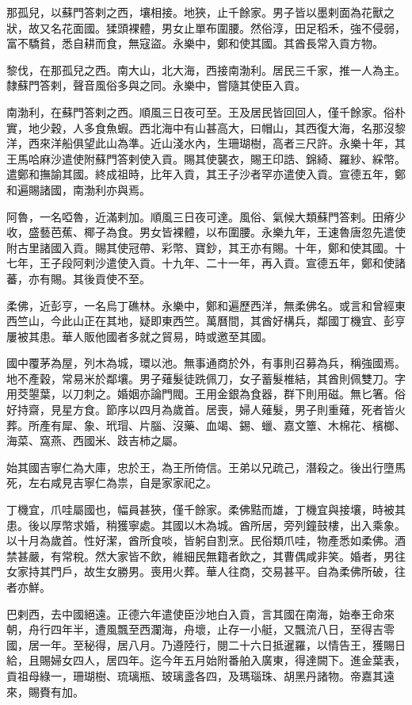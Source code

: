 \begin{pinyinscope}
那孤兒，以蘇門答剌之西，壤相接。地狹，止千餘家。男子皆以墨剌面為花獸之狀，故又名花面國。猱頭裸體，男女止單布圍腰。然俗淳，田足稻禾，強不侵弱，富不驕貧，悉自耕而食，無寇盜。永樂中，鄭和使其國。其酋長常入貢方物。

黎伐，在那孤兒之西。南大山，北大海，西接南渤利。居民三千家，推一人為主。隸蘇門答剌，聲音風俗多與之同。永樂中，嘗隨其使臣入貢。

南渤利，在蘇門答剌之西。順風三日夜可至。王及居民皆回回人，僅千餘家。俗朴實，地少穀，人多食魚蝦。西北海中有山甚高大，曰帽山，其西復大海，名那沒黎洋，西來洋船俱望此山為準。近山淺水內，生珊瑚樹，高者三尺許。永樂十年，其王馬哈麻沙遣使附蘇門答剌使入貢。賜其使襲衣，賜王印誥、錦綺、羅紗、綵幣。遣鄭和撫諭其國。終成祖時，比年入貢，其王子沙者罕亦遣使入貢。宣德五年，鄭和遍賜諸國，南渤利亦與焉。

阿魯，一名啞魯，近滿剌加。順風三日夜可達。風俗、氣候大類蘇門答剌。田瘠少收，盛藝芭蕉、椰子為食。男女皆裸體，以布圍腰。永樂九年，王速魯唐忽先遣使附古里諸國入貢。賜其使冠帶、彩幣、寶鈔，其王亦有賜。十年，鄭和使其國。十七年，王子段阿剌沙遣使入貢。十九年、二十一年，再入貢。宣德五年，鄭和使諸蕃，亦有賜。其後貢使不至。

柔佛，近彭亨，一名烏丁礁林。永樂中，鄭和遍歷西洋，無柔佛名。或言和曾經東西竺山，今此山正在其地，疑即東西竺。萬曆間，其酋好構兵，鄰國丁機宜、彭亨屢被其患。華人販他國者多就之貿易，時或邀至其國。

國中覆茅為屋，列木為城，環以池。無事通商於外，有事則召募為兵，稱強國焉。地不產穀，常易米於鄰壤。男子薙髮徒跣佩刀，女子蓄髮椎結，其酋則佩雙刀。字用茭曌葉，以刀刺之。婚姻亦論門閥。王用金銀為食器，群下則用磁。無匕箸。俗好持齋，見星方食。節序以四月為歲首。居喪，婦人薙髮，男子則重薙，死者皆火葬。所產有犀、象、玳瑁、片腦、沒藥、血竭、錫、蠟、嘉文簟、木棉花、檳榔、海菜、窩燕、西國米、跂吉柿之屬。

始其國吉寧仁為大庫，忠於王，為王所倚信。王弟以兄疏己，潛殺之。後出行墮馬死，左右咸見吉寧仁為祟，自是家家祀之。

丁機宜，爪哇屬國也，幅員甚狹，僅千餘家。柔佛黠而雄，丁機宜與接壤，時被其患。後以厚幣求婚，稍獲寧處。其國以木為城。酋所居，旁列鐘鼓樓，出入乘象。以十月為歲首。性好潔，酋所食啖，皆躬自割烹。民俗類爪哇，物產悉如柔佛。酒禁甚嚴，有常稅。然大家皆不飲，維細民無籍者飲之，其曹偶咸非笑。婚者，男往女家持其門戶，故生女勝男。喪用火葬。華人往商，交易甚平。自為柔佛所破，往者亦鮮。

巴剌西，去中國絕遠。正德六年遣使臣沙地白入貢，言其國在南海，始奉王命來朝，舟行四年半，遭風飄至西瀾海，舟壞，止存一小艇，又飄流八日，至得吉零國，居一年。至秘得，居八月。乃遵陸行，閱二十六日抵暹羅，以情告王，獲賜日給，且賜婦女四人，居四年。迄今年五月始附番舶入廣東，得達闕下。進金葉表，貢祖母綠一，珊瑚樹、琉璃瓶、玻璃盞各四，及瑪瑙珠、胡黑丹諸物。帝嘉其遠來，賜賚有加。


\end{pinyinscope}
